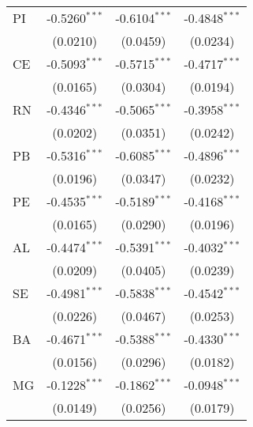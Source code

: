 \begin{tabular}{lccc}
   PI                              & -0.5260$^{***}$         & -0.6104$^{***}$         & -0.4848$^{***}$\\   
                                   & (0.0210)                & (0.0459)                & (0.0234)\\   
   CE                              & -0.5093$^{***}$         & -0.5715$^{***}$         & -0.4717$^{***}$\\   
                                   & (0.0165)                & (0.0304)                & (0.0194)\\   
   RN                              & -0.4346$^{***}$         & -0.5065$^{***}$         & -0.3958$^{***}$\\   
                                   & (0.0202)                & (0.0351)                & (0.0242)\\   
   PB                              & -0.5316$^{***}$         & -0.6085$^{***}$         & -0.4896$^{***}$\\   
                                   & (0.0196)                & (0.0347)                & (0.0232)\\   
   PE                              & -0.4535$^{***}$         & -0.5189$^{***}$         & -0.4168$^{***}$\\   
                                   & (0.0165)                & (0.0290)                & (0.0196)\\   
   AL                              & -0.4474$^{***}$         & -0.5391$^{***}$         & -0.4032$^{***}$\\   
                                   & (0.0209)                & (0.0405)                & (0.0239)\\   
   SE                              & -0.4981$^{***}$         & -0.5838$^{***}$         & -0.4542$^{***}$\\   
                                   & (0.0226)                & (0.0467)                & (0.0253)\\   
   BA                              & -0.4671$^{***}$         & -0.5388$^{***}$         & -0.4330$^{***}$\\   
                                   & (0.0156)                & (0.0296)                & (0.0182)\\   
   MG                              & -0.1228$^{***}$         & -0.1862$^{***}$         & -0.0948$^{***}$\\   
                                   & (0.0149)                & (0.0256)                & (0.0179)\\   

\end{tabular}
